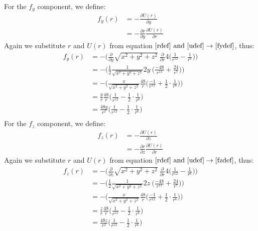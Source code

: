 \documentclass[a4paper,12pt]{article}
\begin{document}
For the $f_y$ component, we define:
\begin{equation}\label{fydef}
\begin{aligned}
f_y(r) &=-\frac{\partial U(r)}{\partial y}\\
&= -\frac{\partial r}{\partial y}\frac{\partial U(r)}{\partial r}
\end{aligned}
\end{equation}
Again we substitute $r$ and $U(r)$ from equation $\eqref{rdef}\ \text{and}\ \eqref{udef} \rightarrow\eqref{fydef}$, thus:
\begin{equation}\label{fycomp}
\begin{aligned}
f_y(r) &= - \bigg( \frac{\partial}{\partial y} \sqrt{x^2+y^2+z^2}\ \frac{\partial}{\partial r} 4 \bigg(\frac{1}{r^{12}}-\frac{1}{r^6}\bigg) \bigg) \\
&= - \bigg( \frac{1}{2} \frac{1}{\sqrt{x^2+y^2+z^2}}2y\ \bigg( \frac{-48}{r^{13}}+\frac{24}{r^7} \bigg) \bigg)\\
&= - \bigg( \frac{x}{\sqrt{x^2+y^2+z^2}} \frac{48}{r} \bigg( \frac{-1}{r^{12}}+\frac{1}{2} \cdot \frac{1}{r^6} \bigg) \bigg)\\
&=  \frac{y}{r} \frac{48}{r} \bigg( \frac{1}{r^{12}}-\frac{1}{2} \cdot \frac{1}{r^6} \bigg)\\
&=  \frac{48y}{r^2} \bigg( \frac{1}{r^{12}}-\frac{1}{2} \cdot \frac{1}{r^6} \bigg)\\
\end{aligned}
\end{equation}
For the $f_z$ component, we define:
\begin{equation}\label{fzdef}
\begin{aligned}
f_z(r) &=-\frac{\partial U(r)}{\partial z}\\
&= -\frac{\partial r}{\partial z}\frac{\partial U(r)}{\partial r}
\end{aligned}
\end{equation}
Again we substitute $r$ and $U(r)$ from equation $\eqref{rdef}\ \text{and}\ \eqref{udef} \rightarrow\eqref{fzdef}$, thus:
\begin{equation}\label{fzcomp}
\begin{aligned}
f_z(r) &= - \bigg( \frac{\partial}{\partial z} \sqrt{x^2+y^2+z^2}\ \frac{\partial}{\partial r} 4 \bigg(\frac{1}{r^{12}}-\frac{1}{r^6}\bigg) \bigg) \\
&= - \bigg( \frac{1}{2} \frac{1}{\sqrt{x^2+y^2+z^2}}2z\ \bigg( \frac{-48}{r^{13}}+\frac{24}{r^7} \bigg) \bigg)\\
&= - \bigg( \frac{x}{\sqrt{x^2+y^2+z^2}} \frac{48}{r} \bigg( \frac{-1}{r^{12}}+\frac{1}{2} \cdot \frac{1}{r^6} \bigg) \bigg)\\
&=  \frac{z}{r} \frac{48}{r} \bigg( \frac{1}{r^{12}}-\frac{1}{2} \cdot \frac{1}{r^6} \bigg)\\
&=  \frac{48z}{r^2} \bigg( \frac{1}{r^{12}}-\frac{1}{2} \cdot \frac{1}{r^6} \bigg)\\
\end{aligned}
\end{equation}
\end{document}
